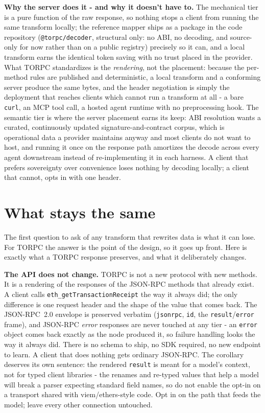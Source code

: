 \documentclass[11pt]{article}
\newcommand{\code}[1]{\texttt{#1}}
\begin{document}
\textbf{Why the server does it - and why it doesn't have to.} The mechanical tier is a pure function of the raw response, so nothing stops a client from running the same transform locally; the reference mapper ships as a package in the code repository (\code{@torpc/decoder}, structural only: no ABI, no decoding, and source-only for now rather than on a public registry) precisely so it can, and a local transform earns the identical token saving with no trust placed in the provider. What TORPC standardizes is the \emph{rendering}, not the placement: because the per-method rules are published and deterministic, a local transform and a conforming server produce the same bytes, and the header negotiation is simply the deployment that reaches clients which cannot run a transform at all - a bare \code{curl}, an MCP tool call, a hosted agent runtime with no preprocessing hook. The semantic tier is where the server placement earns its keep: ABI resolution wants a curated, continuously updated signature-and-contract corpus, which is operational data a provider maintains anyway and most clients do not want to host, and running it once on the response path amortizes the decode across every agent downstream instead of re-implementing it in each harness. A client that prefers sovereignty over convenience loses nothing by decoding locally; a client that cannot, opts in with one header.

\section{What stays the same}

The first question to ask of any transform that rewrites data is what it can lose. For TORPC the answer is the point of the design, so it goes up front. Here is exactly what a TORPC response preserves, and what it deliberately changes.

\textbf{The API does not change.} TORPC is not a new protocol with new methods. It is a rendering of the responses of the JSON-RPC methods that already exist. A client calls \code{eth\_getTransactionReceipt} the way it always did; the only difference is one request header and the shape of the value that comes back. The JSON-RPC~2.0 envelope is preserved verbatim (\code{jsonrpc}, \code{id}, the \code{result}/\code{error} frame), and JSON-RPC \emph{error} responses are never touched at any tier - an \code{error} object comes back exactly as the node produced it, so failure handling looks the way it always did. There is no schema to ship, no SDK required, no new endpoint to learn. A client that does nothing gets ordinary JSON-RPC. The corollary deserves its own sentence: the rendered \code{result} is meant for a model's context, not for typed client libraries - the renames and re-typed values that help a model will break a parser expecting standard field names, so do not enable the opt-in on a transport shared with viem/ethers-style code. Opt in on the path that feeds the model; leave every other connection untouched.
\end{document}
